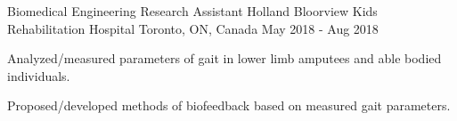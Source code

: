 \begin{cventries}
  \cventry
    {Biomedical Engineering Research Assistant} %
    {Holland Bloorview Kids Rehabilitation Hospital} %
    {Toronto, ON, Canada} %
    {May 2018 - Aug 2018} %
    {
      \begin{cvitems} %
        \item {Analyzed/measured parameters of gait in lower limb amputees and able bodied individuals.}
        \item {Proposed/developed methods of biofeedback based on measured gait parameters.}
      \end{cvitems}
    }
    
\end{cventries}
